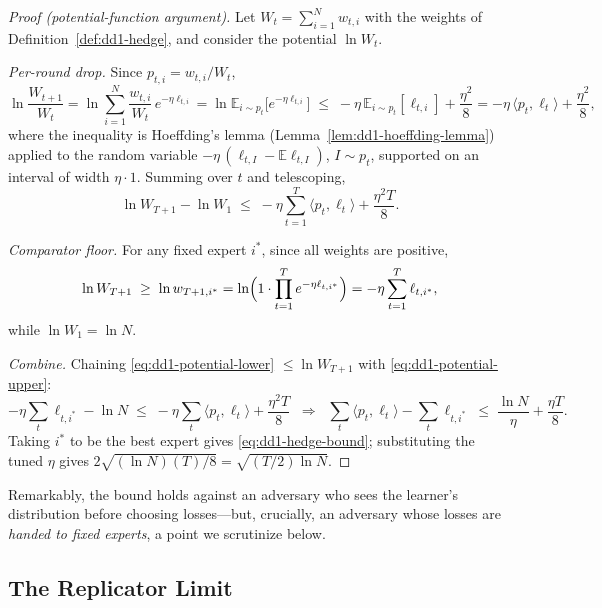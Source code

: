 \documentclass[11pt,a4paper]{article}
\theoremstyle{definition}
\theoremstyle{plain}
\newcommand{\E}{\mathbb{E}}
\begin{document}
\begin{proof}[Proof (potential-function argument)]
Let $W_t = \sum_{i=1}^N w_{t,i}$ with the weights of
Definition~\ref{def:dd1-hedge}, and consider the potential $\ln W_t$.

\emph{Per-round drop.} Since $p_{t,i} = w_{t,i} / W_t$,
\[
\ln \frac{W_{t+1}}{W_t}
= \ln \sum_{i=1}^N \frac{w_{t,i}}{W_t}\, e^{-\eta \ell_{t,i}}
= \ln \E_{i \sim p_t}\bigl[ e^{-\eta \ell_{t,i}} \bigr]
\;\le\; -\eta\, \E_{i \sim p_t}[\ell_{t,i}] + \frac{\eta^2}{8}
= -\eta\, \langle p_t, \ell_t \rangle + \frac{\eta^2}{8},
\]
where the inequality is Hoeffding's lemma
(Lemma~\ref{lem:dd1-hoeffding-lemma}) applied to the random variable
$-\eta\,(\ell_{t,I} - \E\ell_{t,I})$, $I \sim p_t$, supported on an interval
of width $\eta \cdot 1$. Summing over $t$ and telescoping,
\begin{equation}
\label{eq:dd1-potential-upper}
\ln W_{T+1} - \ln W_1
\;\le\; -\eta \sum_{t=1}^T \langle p_t, \ell_t \rangle + \frac{\eta^2 T}{8}.
\end{equation}

\emph{Comparator floor.} For any fixed expert $i^*$, since all weights are
positive,
\begin{equation}
\label{eq:dd1-potential-lower}
\ln W_{T+1} \;\ge\; \ln w_{T+1, i^*}
= \ln\Bigl( 1 \cdot \prod_{t=1}^T e^{-\eta \ell_{t, i^*}} \Bigr)
= -\eta \sum_{t=1}^T \ell_{t, i^*},
\end{equation}
while $\ln W_1 = \ln N$.

\emph{Combine.} Chaining \eqref{eq:dd1-potential-lower} $\le \ln W_{T+1}$
with \eqref{eq:dd1-potential-upper}:
\[
-\eta \sum_t \ell_{t, i^*} - \ln N
\;\le\; -\eta \sum_t \langle p_t, \ell_t \rangle + \frac{\eta^2 T}{8}
\;\;\Longrightarrow\;\;
\sum_t \langle p_t, \ell_t \rangle - \sum_t \ell_{t, i^*}
\;\le\; \frac{\ln N}{\eta} + \frac{\eta T}{8}.
\]
Taking $i^*$ to be the best expert gives \eqref{eq:dd1-hedge-bound};
substituting the tuned $\eta$ gives
$2\sqrt{(\ln N)(T)/8} = \sqrt{(T/2)\ln N}$.
\end{proof}

Remarkably, the bound holds against an adversary who sees the learner's
distribution before choosing losses---but, crucially, an adversary whose
losses are \emph{handed to fixed experts}, a point we scrutinize below.

\subsection{The Replicator Limit}
\end{document}
